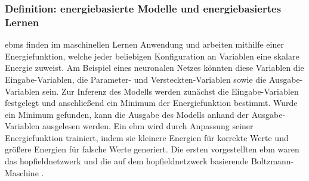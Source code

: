 \subsubsection{Definition: energiebasierte Modelle und energiebasiertes Lernen}

\glspl{ebm} finden im maschinellen Lernen Anwendung und arbeiten mithilfe einer Energiefunktion, welche jeder beliebigen Konfiguration an Variablen eine skalare Energie zuweist. Am Beispiel eines neuronalen Netzes könnten diese Variablen die Eingabe-Variablen, die Parameter- und Versteckten-Variablen sowie die Ausgabe-Variablen sein. Zur Inferenz des Modells werden zunächst die Eingabe-Variablen festgelegt und anschließend ein Minimum der Energiefunktion bestimmt. Wurde ein Minimum gefunden, kann die Ausgabe des Modells anhand der Ausgabe-Variablen ausgelesen werden. Ein \ac{ebm} wird durch Anpassung seiner Energiefunktion trainiert, indem sie kleinere Energien für korrekte Werte und größere Energien für falsche Werte generiert. \cite{Lecun2006} Die ersten vorgestellten \ac{ebm} waren das \gls{hopfieldnetzwerk} \cite{Hopfield1984} und die auf dem \gls{hopfieldnetzwerk} basierende Boltzmann-Maschine \cite{Ackley1985}.
